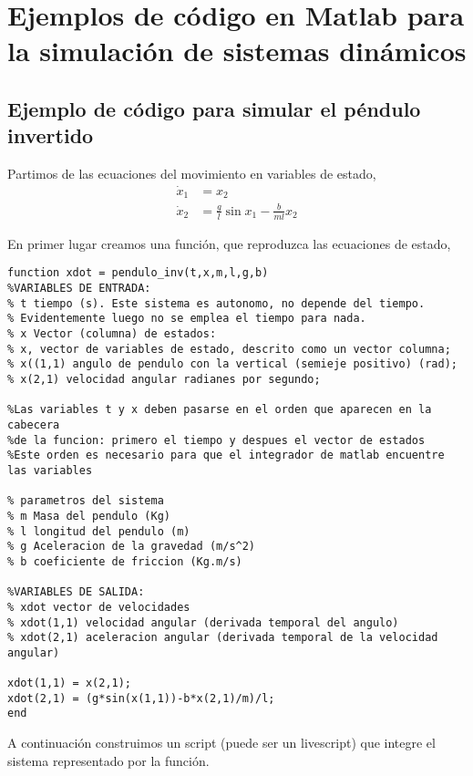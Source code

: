 \appendix
\chapter[Ejemplos de codigo de simulación]{Ejemplos de código en Matlab para la simulación de sistemas dinámicos}\label{apend1}

\section[Código para el péndulo invertido]{Ejemplo de código para simular el péndulo invertido}
Partimos de las ecuaciones del movimiento en variables de estado,
\begin{align*}
\dot x_1 &= x_2\\
\dot x_2 &= \frac{g}{l}\sin x_1 - \frac{b}{ml}x_2
\end{align*}

En primer lugar creamos una función, que reproduzca las ecuaciones de estado, 
\begin{lstlisting}
function xdot = pendulo_inv(t,x,m,l,g,b)
%VARIABLES DE ENTRADA:
% t tiempo (s). Este sistema es autonomo, no depende del tiempo. 
% Evidentemente luego no se emplea el tiempo para nada.
% x Vector (columna) de estados: 
% x, vector de variables de estado, descrito como un vector columna;  
% x((1,1) angulo de pendulo con la vertical (semieje positivo) (rad);
% x(2,1) velocidad angular radianes por segundo;

%Las variables t y x deben pasarse en el orden que aparecen en la cabecera
%de la funcion: primero el tiempo y despues el vector de estados
%Este orden es necesario para que el integrador de matlab encuentre las variables

% parametros del sistema
% m Masa del pendulo (Kg)
% l longitud del pendulo (m)
% g Aceleracion de la gravedad (m/s^2)
% b coeficiente de friccion (Kg.m/s)

%VARIABLES DE SALIDA:
% xdot vector de velocidades 
% xdot(1,1) velocidad angular (derivada temporal del angulo)
% xdot(2,1) aceleracion angular (derivada temporal de la velocidad angular)

xdot(1,1) = x(2,1);
xdot(2,1) = (g*sin(x(1,1))-b*x(2,1)/m)/l;
end
\end{lstlisting}

A continuación construimos un script (puede ser un livescript) que integre el sistema representado por la función.

